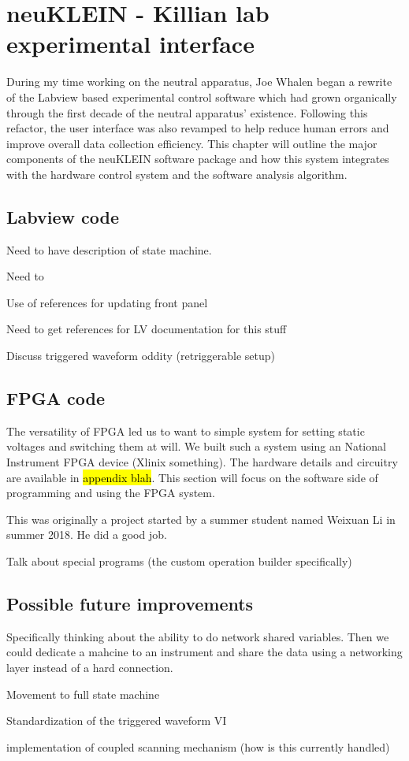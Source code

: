 \chapter{neuKLEIN - Killian lab experimental interface}
During my time working on the neutral apparatus, Joe Whalen began a rewrite of the Labview based experimental control software which had grown organically through the first decade of the neutral apparatus' existence. Following this refactor, the user interface was also revamped to help reduce human errors and improve overall data collection efficiency. This chapter will outline the major components of the neuKLEIN software package and how this system integrates with the hardware control system and the software analysis algorithm.

\section{Labview code}
Need to have description of state machine.

Need to 

Use of references for updating front panel

Need to get references for LV documentation for this stuff

Discuss triggered waveform oddity (retriggerable setup)




\section{FPGA code}
The versatility of FPGA led us to want to simple system for setting static voltages and switching them at will. We built such a system using an National Instrument FPGA device (Xlinix something). The hardware details and circuitry are available in \hl{appendix blah}. This section will focus on the software side of programming and using the FPGA system.

This was originally a project started by a summer student named Weixuan Li in summer 2018. He did a good job.

Talk about special programs (the custom operation builder specifically)

\section{Possible future improvements}
Specifically thinking about the ability to do network shared variables. Then we could dedicate a mahcine to an instrument and share the data using a networking layer instead of a hard connection.

Movement to full state machine

Standardization of the triggered waveform VI

implementation of coupled scanning mechanism (how is this currently handled)



